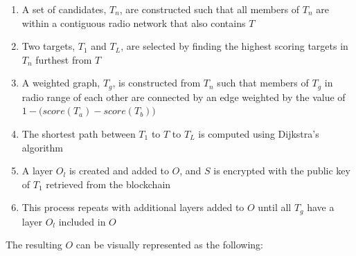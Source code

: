 \documentclass[10pt, nonatbib, nocopyrightspace, reprint]{sigplanconf}
\begin{document}
\begin{enumerate}
  \item A set of candidates, $T_n$, are constructed such that all members of $T_n$ are within a contiguous radio network that also contains $T$
  \item Two targets, $T_1$ and $T_L$, are selected by finding the highest scoring targets in $T_n$ furthest from $T$
  \item A weighted graph, $T_g$, is constructed from $T_n$ such that members of $T_g$ in radio range of each other are connected by an edge weighted by the value of \(1 - \Big({score(T_a) - score(T_b)}\Big)\)
  \item The shortest path between $T_1$ to $T$ to $T_L$ is computed using Dijkstra's algorithm\cite{dijkstra}
  \item A layer $O_l$ is created and added to $O$, and $S$ is encrypted with the public key of $T_1$ retrieved from the blockchain
  \item This process repeats with additional layers added to $O$ until all $T_g$ have a layer $O_l$ included in $O$
\end{enumerate}

The resulting $O$ can be visually represented as the following:
\end{document}
